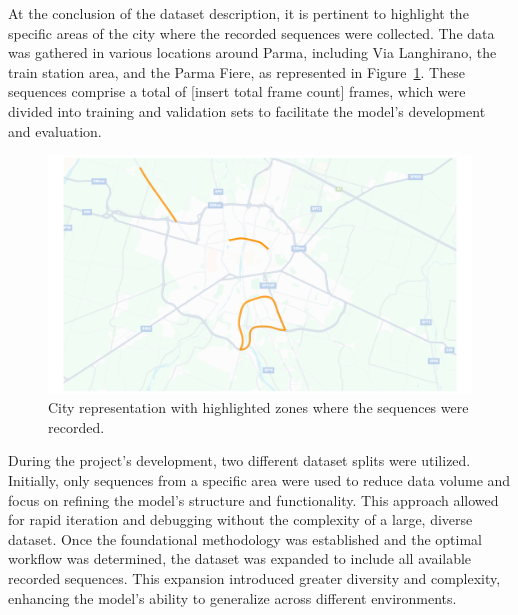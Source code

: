 At the conclusion of the dataset description, it is pertinent to highlight the specific areas of the city where the recorded sequences were collected. The data was gathered in various locations around Parma, including Via Langhirano, the train station area, and the Parma Fiere, as represented in Figure~\ref{fig:dataset_map}. These sequences comprise a total of [insert total frame count] frames, which were divided into training and validation sets to facilitate the model's development and evaluation.
\begin{figure}[H]
    \centering
    \includegraphics[width=0.9\linewidth]{LateX//figs/sequence_map.pdf}
    \caption{City representation with highlighted zones where the sequences were recorded.}
    \label{fig:dataset_map}
\end{figure}

During the project's development, two different dataset splits were utilized. Initially, only sequences from a specific area were used to reduce data volume and focus on refining the model's structure and functionality. This approach allowed for rapid iteration and debugging without the complexity of a large, diverse dataset. Once the foundational methodology was established and the optimal workflow was determined, the dataset was expanded to include all available recorded sequences. This expansion introduced greater diversity and complexity, enhancing the model's ability to generalize across different environments.

